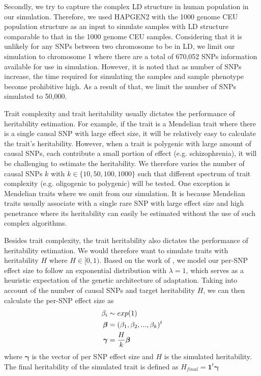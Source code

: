 			Secondly, we try to capture the complex \gls{LD} structure in human population in our simulation.
			Therefore, we used HAPGEN2\citep{Su2011} with the 1000 genome \gls{CEU} population structure as an input to simulate samples with \gls{LD} structure comparable to that in the 1000 genome \gls{CEU} samples.
			Considering that it is unlikely for any \glspl{SNP} between two chromosome to be in \gls{LD}, we limit our simulation to chromosome 1 where there are a total of 670,052 \glspl{SNP} information available for use in simulation.
			However, it is noted that as number of \glspl{SNP} increase, the time required for simulating the samples and sample phenotype become prohibitive high. 
			As a result of that, we limit the number of \glspl{SNP} simulated to 50,000. 
			
			Trait complexity and trait heritability usually dictates the performance of heritability estimation.
			For example, if the trait is a Mendelian trait where there is a single causal \gls{SNP} with large effect size, it will be relatively easy to calculate the trait's heritability.
			However, when a trait is polygenic with large amount of causal \glspl{SNP}, each contribute a small portion of effect (e.g. schizophrenia), it will be challenging to estimate the heritability.
			We therefore varies the number of causal \glspl{SNP} $k$ with $k\in\{10,50,100,1000\}$ such that different spectrum of trait complexity (e.g. oligogenic to polygenic) will be tested. 
			One exception is Mendelian traits where we omit from our simulation.
			It is because Mendelian traits usually associate with a single rare \gls{SNP} with large effect size and high penetrance where its heritability can easily be estimated without the use of such complex algorithms.
			
			Besides trait complexity, the trait heritability also dictates the performance of heritability estimation. 
			We would therefore want to simulate traits with heritability $H$ where $H\in[0,1)$. 
			Based on the work of \citet{Orr1998}, we model our per-\gls{SNP} effect size to follow an exponential distribution with $\lambda=1$, which serves as a heuristic expectation of the genetic architecture of adaptation.
			Taking into account of the number of causal \glspl{SNP} and target heritability $H$, we can then calculate the per-\gls{SNP} effect size as
			\begin{align}
			\beta_i &\sim exp(1)\notag\\
			\boldsymbol{\beta}&=(\beta_1,\beta_2,...,\beta_k)^t\notag\\
			\boldsymbol{\gamma} &= \frac{H}{k}\boldsymbol{\beta}
			\label{eq:snpEffect}
			\end{align}
			where $\boldsymbol{\gamma}$ is the vector of per SNP effect size and $H$ is the simulated heritability.
			The final heritability of the simulated trait is defined as $H_{final}=\boldsymbol{1}^t\boldsymbol{\gamma}$
			

